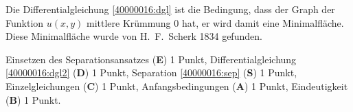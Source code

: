 \begin{diskussion}
Die Differentialgleichung \eqref{40000016:dgl} ist die Bedingung, dass der
Graph der Funktion $u(x,y)$ mittlere Krümmung $0$ hat, er wird damit eine
Minimalfläche.
Diese Minimalfläche wurde von H.~F.~Scherk 1834 gefunden.
\end{diskussion}

\begin{bewertung}
Einsetzen des Separationsansatzes ({\bf E}) 1 Punkt,
Differentialgleichung \eqref{40000016:dgl2} ({\bf D}) 1 Punkt,
Separation \eqref{40000016:sep} ({\bf S}) 1 Punkt,
Einzelgleichungen ({\bf C}) 1 Punkt,
Anfangsbedingungen ({\bf A}) 1 Punkt,
Eindeutigkeit ({\bf B}) 1 Punkt.
\end{bewertung}




